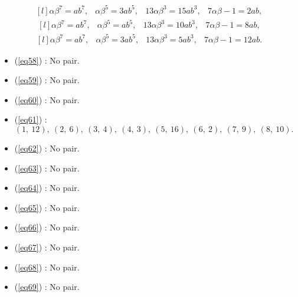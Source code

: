 \documentclass[12pt,a4wide, reqno]{amsart}
\theoremstyle{definition}
\theoremstyle{remark}
\numberwithin{equation}{section}
\begin{document}
\begin{equation}\label{eq67}
    \begin{matrix*}[l]
          \alpha \beta ^7=ab^7, & \alpha \beta ^5=3ab^5, & 13\alpha \beta ^3=15ab ^3, & 7\alpha\beta-1=2ab,
    \end{matrix*}
\end{equation}
\begin{equation}\label{eq68}
    \begin{matrix*}[l]
          \alpha \beta ^7=ab^7, & \alpha \beta ^5=ab^5, & 13\alpha \beta ^3=10ab ^3, & 7\alpha\beta-1=8ab,
    \end{matrix*}
\end{equation}
\begin{equation}\label{eq69}
    \begin{matrix*}[l]
          \alpha \beta ^7=ab^7, & \alpha \beta ^5=3ab^5, & 13\alpha \beta ^3=5ab ^3, & 7\alpha\beta-1=12ab.
    \end{matrix*}
\end{equation}
\begin{itemize}
    \item 
    (\ref{eq58}) : No pair.
    \item 
    (\ref{eq59}) : No pair.
    \item 
    (\ref{eq60}) : No pair.
    \item 
    (\ref{eq61}) : $(1,~12),~(2,~6),~(3,~4),~(4,~3),~(5,~16),~(6,~2),~(7,~9),~(8,~10).$
    \item 
    (\ref{eq62}) : No pair.
    \item
    (\ref{eq63}) : No pair.
    \item 
    (\ref{eq64}) : No pair.
    \item 
    (\ref{eq65}) : No pair.
    \item 
    (\ref{eq66}) : No pair.
    \item 
    (\ref{eq67}) : No pair.
    \item 
    (\ref{eq68}) : No pair.
    \item 
    (\ref{eq69}) : No pair.
    \end{itemize}
\end{document}
